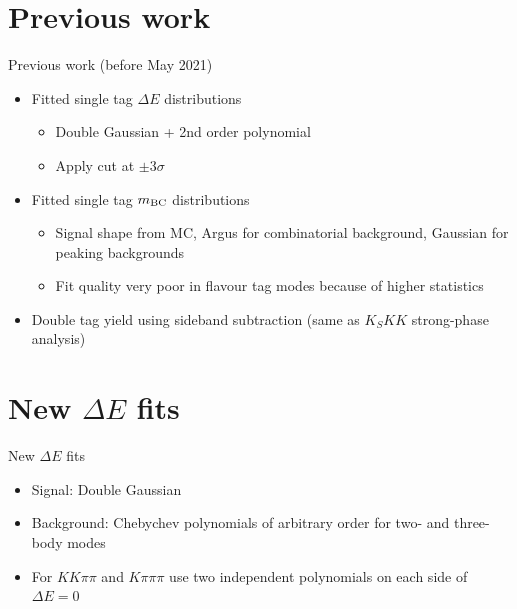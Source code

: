 \documentclass{beamer}
\begin{document}
\section{Previous work}
\begin{frame}{Previous work (before May 2021)}
  \begin{itemize}
    \setlength\itemsep{2em}
    \item{Fitted single tag $\Delta E$ distributions}
    \begin{itemize}
      \item{Double Gaussian + 2nd order polynomial}
      \item{Apply cut at $\pm3\sigma$}
    \end{itemize}
    \item{Fitted single tag $m_{\rm BC}$ distributions}
    \begin{itemize}
      \item{Signal shape from MC, Argus for combinatorial background, Gaussian for peaking backgrounds}
      \item{Fit quality very poor in flavour tag modes because of higher statistics}
    \end{itemize}
    \item{Double tag yield using sideband subtraction (same as $K_SKK$ strong-phase analysis)}
  \end{itemize}
\end{frame}

\section{New \texorpdfstring{$\Delta E$}{DeltaE} fits}
\begin{frame}{New $\Delta E$ fits}
  \begin{itemize}
    \setlength\itemsep{2em}
    \item{Signal: Double Gaussian}
    \item{Background: Chebychev polynomials of arbitrary order for two- and three-body modes}
    \item{For $KK\pi\pi$ and $K\pi\pi\pi$ use two independent polynomials on each side of $\Delta E = 0$}
  \end{itemize}
\end{frame}
\end{document}
